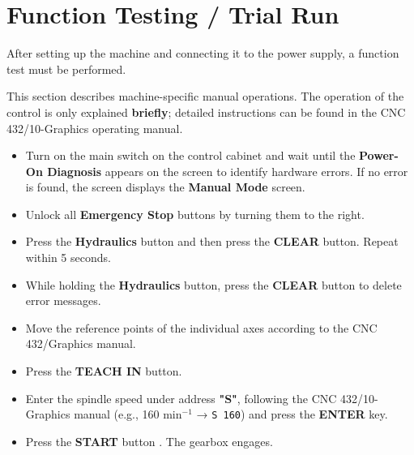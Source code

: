 
\section{Function Testing / Trial Run}

After setting up the machine and connecting it to the power supply, a function test must be performed.

This section describes machine-specific manual operations. The operation of the control is only explained \textbf{briefly}; detailed instructions can be found in the CNC 432/10-Graphics operating manual.

\begin{itemize}
    \item Turn on the main switch on the control cabinet and wait until the \textbf{Power-On Diagnosis} appears on the screen to identify hardware errors. If no error is found, the screen displays the \textbf{Manual Mode} screen.
    
    \item Unlock all \textbf{Emergency Stop} buttons by turning them to the right.
    
    \item Press the \textbf{Hydraulics} button  and then press the \textbf{CLEAR} button. Repeat within 5 seconds.
    
    \item While holding the \textbf{Hydraulics} button, press the \textbf{CLEAR} button to delete error messages.
    
    \item Move the reference points of the individual axes according to the CNC 432/Graphics manual.
    
    \item Press the \textbf{TEACH IN} button.
    
    \item Enter the spindle speed under address \textbf{"S"}, following the CNC 432/10-Graphics manual (e.g., 160 min\(^{-1}\) → \texttt{S 160}) and press the \textbf{ENTER} key.
    
    \item Press the \textbf{START} button . The gearbox engages.
\end{itemize}


